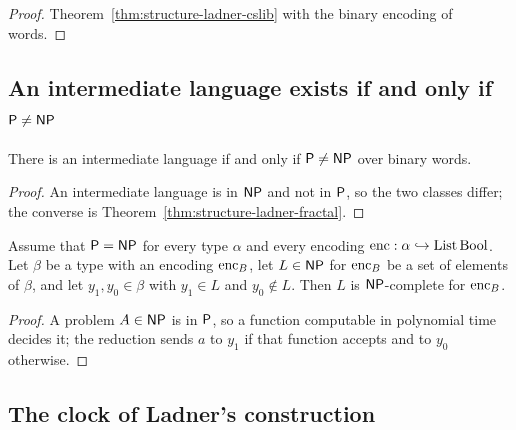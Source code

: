 \begin{proof}
  \leanok
  Theorem~\ref{thm:structure-ladner-cslib} with the binary encoding of words.
\end{proof}

\subsection{An intermediate language exists if and only if $\mathsf{P} \neq \mathsf{NP}$}

\begin{theorem}
  \label{thm:structure-intermedio-iff}
  \leanok
  There is an intermediate language if and only if $\mathsf{P} \neq \mathsf{NP}$ over binary words.
  \own{}
\end{theorem}

\begin{proof}
  \leanok
  An intermediate language is in $\cNP$ and not in $\mathsf{P}$, so the two classes differ; the converse
  is Theorem~\ref{thm:structure-ladner-fractal}.
\end{proof}

\begin{theorem}[If $\cP = \cNP$, every non-trivial language of $\cNP$ is complete]
  \label{thm:structure-completo-de-p-eq-np}
  \leanok
  Assume that $\cP = \cNP$ for every type $\alpha$ and every encoding $\mathrm{enc} : \alpha
  \hookrightarrow \mathrm{List}\,\mathrm{Bool}$. Let $\beta$ be a type with an encoding $\mathrm{enc}_B$, let
  $L \in \mathsf{NP}$ for $\mathrm{enc}_B$ be a set of elements of $\beta$, and let $y_1, y_0 \in \beta$ with
  $y_1 \in L$ and $y_0 \notin L$. Then $L$ is $\cNP$-complete for $\mathrm{enc}_B$.
  \own{}
\end{theorem}

\begin{proof}
  \leanok
  A problem $A \in \mathsf{NP}$ is in $\mathsf{P}$, so a function computable in polynomial time decides it; the
  reduction sends $a$ to $y_1$ if that function accepts and to $y_0$ otherwise.
\end{proof}

\subsection{The clock of Ladner's construction}

